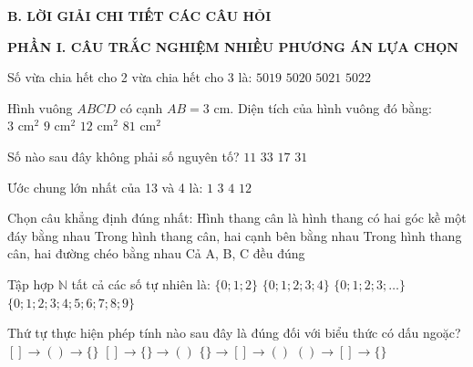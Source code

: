 \documentclass[12pt,a4paper]{article}
\begin{document}
\noindent\textbf{\large B. LỜI GIẢI CHI TIẾT CÁC CÂU HỎI}
\vspace{2mm}

\noindent\textbf{\large PHẦN I. CÂU TRẮC NGHIỆM NHIỀU PHƯƠNG ÁN LỰA CHỌN}
\vspace{1mm}
\begin{ex}
Số vừa chia hết cho 2 vừa chia hết cho 3 là:
\choice
{$5019$}
{$5020$}
{$5021$}
{\True $5022$}
\end{ex}

\begin{ex}
Hình vuông $ABCD$ có cạnh $AB = 3\text{ cm}$. Diện tích của hình vuông đó bằng:
\choice
{$3\text{ cm}^2$}
{\True $9\text{ cm}^2$}
{$12\text{ cm}^2$}
{$81\text{ cm}^2$}
\end{ex}

\begin{ex}
Số nào sau đây không phải số nguyên tố?
\choice
{$11$}
{\True $33$}
{$17$}
{$31$}
\end{ex}

\begin{ex}
Ước chung lớn nhất của 13 và 4 là:
\choice
{\True $1$}
{$3$}
{$4$}
{$12$}
\end{ex}

\begin{ex}
Chọn câu khẳng định đúng nhất:
\choice
{Hình thang cân là hình thang có hai góc kề một đáy bằng nhau}
{Trong hình thang cân, hai cạnh bên bằng nhau}
{Trong hình thang cân, hai đường chéo bằng nhau}
{\True Cả A, B, C đều đúng}
\end{ex}

\begin{ex}
Tập hợp $\mathbb{N}$ tất cả các số tự nhiên là:
\choice
{$\{0; 1; 2\}$}
{$\{0; 1; 2; 3; 4\}$}
{\True $\{0; 1; 2; 3; \dots\}$}
{$\{0; 1; 2; 3; 4; 5; 6; 7; 8; 9\}$}
\end{ex}

\begin{ex}
Thứ tự thực hiện phép tính nào sau đây là đúng đối với biểu thức có dấu ngoặc?
\choice
{$[] \to () \to \{\}$}
{$[] \to \{\} \to ()$}
{$\{\} \to [] \to ()$}
{\True $() \to [] \to \{\}$}
\end{ex}
\end{document}
